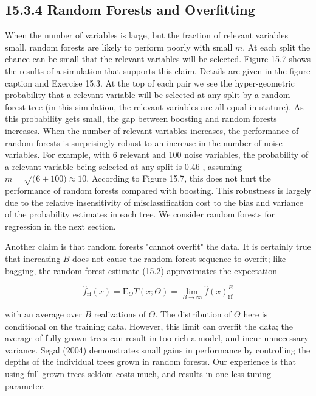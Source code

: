 \documentclass[10pt]{article}
\begin{document}
\subsection*{15.3.4 Random Forests and Overfitting}
When the number of variables is large, but the fraction of relevant variables small, random forests are likely to perform poorly with small $m$. At each split the chance can be small that the relevant variables will be selected. Figure 15.7 shows the results of a simulation that supports this claim. Details are given in the figure caption and Exercise 15.3. At the top of each pair we see the hyper-geometric probability that a relevant variable will be selected at any split by a random forest tree (in this simulation, the relevant variables are all equal in stature). As this probability gets small, the gap between boosting and random forests increases. When the number of relevant variables increases, the performance of random forests is surprisingly robust to an increase in the number of noise variables. For example, with 6 relevant and 100 noise variables, the probability of a relevant variable being selected at any split is 0.46 , assuming $m=\sqrt{( } 6+100) \approx 10$. According to Figure 15.7, this does not hurt the performance of random forests compared with boosting. This robustness is largely due to the relative insensitivity of misclassification cost to the bias and variance of the probability estimates in each tree. We consider random forests for regression in the next section.

Another claim is that random forests "cannot overfit" the data. It is certainly true that increasing $B$ does not cause the random forest sequence to overfit; like bagging, the random forest estimate (15.2) approximates the expectation


\begin{equation*}
\hat{f}_{\mathrm{rf}}(x)=\mathrm{E}_{\Theta} T(x ; \Theta)=\lim _{B \rightarrow \infty} \hat{f}(x)_{\mathrm{rf}}^{B} \tag{15.3}
\end{equation*}


with an average over $B$ realizations of $\Theta$. The distribution of $\Theta$ here is conditional on the training data. However, this limit can overfit the data; the average of fully grown trees can result in too rich a model, and incur unnecessary variance. Segal (2004) demonstrates small gains in performance by controlling the depths of the individual trees grown in random forests. Our experience is that using full-grown trees seldom costs much, and results in one less tuning parameter.
\end{document}
